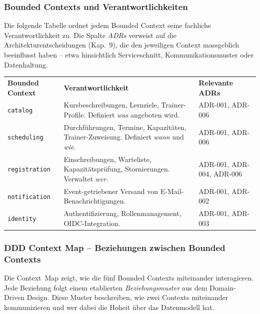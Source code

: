 \subsubsection{Bounded Contexts und Verantwortlichkeiten}

Die folgende Tabelle ordnet jedem Bounded Context seine fachliche
Verantwortlichkeit zu. Die Spalte \emph{ADRs} verweist auf die
Architekturentscheidungen (Kap.~9), die den jeweiligen Context
massgeblich beeinflusst haben -- etwa hinsichtlich Serviceschnitt,
Kommunikationsmuster oder Datenhaltung.

\begin{tabularx}{\textwidth}{L{2.5cm} X L{2.5cm}}
  \color{white}\textbf{Bounded Context} &
  \color{white}\textbf{Verantwortlichkeit} &
  \color{white}\textbf{Relevante ADRs} \\

  \texttt{catalog} &
  Kursbeschreibungen, Lernziele, Trainer-Profile.
  Definiert \emph{was} angeboten wird. &
  ADR-001, ADR-006 \\

  \texttt{scheduling} &
  Durchführungen, Termine, Kapazitäten,
  Trainer-Zuweisung. Definiert \emph{wann} und
  \emph{wie}. &
  ADR-001, ADR-006 \\

  \texttt{registration} &
  Einschreibungen, Warteliste, Kapazitätsprüfung,
  Stornierungen. Verwaltet \emph{wer}. &
  ADR-001, ADR-004, ADR-006 \\

  \texttt{notification} &
  Event-getriebener Versand von
  E-Mail-Benach\-richtigun\-gen. &
  ADR-001, ADR-002 \\

  \texttt{identity} &
  Authentifizierung, Rollenmanagement,
  OIDC-Integration. &
  ADR-001, ADR-003 \\
\end{tabularx}


\subsubsection{DDD Context Map -- Beziehungen zwischen Bounded Contexts}

Die Context~Map zeigt, wie die fünf Bounded Contexts miteinander
interagieren. Jede Beziehung folgt einem etablierten
\emph{Beziehungsmuster} aus dem Domain-Driven Design. Diese Muster
beschreiben, wie zwei Contexts miteinander kommunizieren und wer
dabei die Hoheit über das Datenmodell hat.

